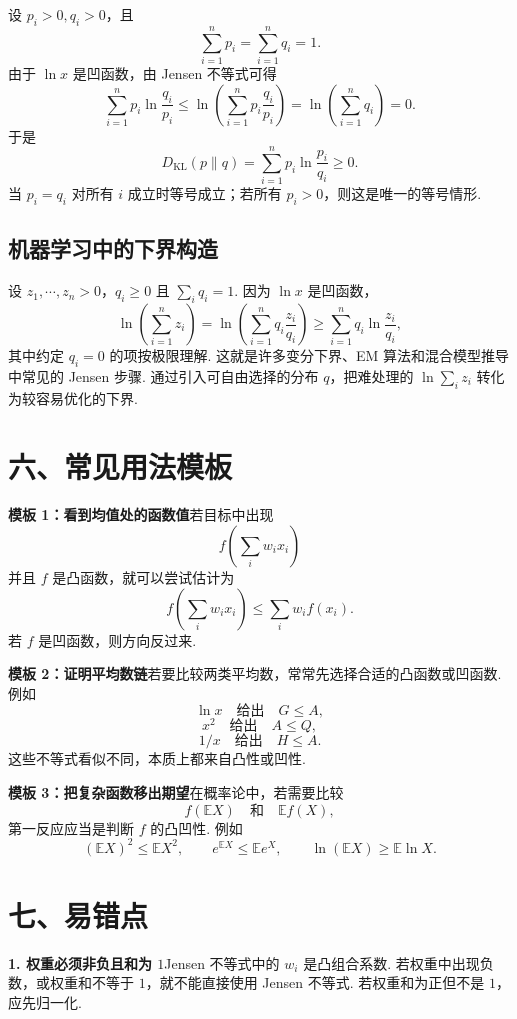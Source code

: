 \documentclass[UTF8,12pt,a4paper,fontset=fandol]{ctexart}
\begin{document}
设 $p_i>0,q_i>0$，且
\[
  \sum_{i=1}^n p_i=\sum_{i=1}^n q_i=1.
\]
由于 $\ln x$ 是凹函数，由 Jensen 不等式可得
\[
  \sum_{i=1}^n p_i\ln\frac{q_i}{p_i}
  \le
  \ln\left(\sum_{i=1}^n p_i\frac{q_i}{p_i}\right)
  =
  \ln\left(\sum_{i=1}^n q_i\right)
  =0.
\]
于是
\[
  D_{\mathrm{KL}}(p\|q)
  =
  \sum_{i=1}^n p_i\ln\frac{p_i}{q_i}
  \ge0.
\]
当 $p_i=q_i$ 对所有 $i$ 成立时等号成立；若所有 $p_i>0$，则这是唯一的等号情形.

\subsection*{机器学习中的下界构造}

设 $z_1,\cdots,z_n>0$，$q_i\ge0$ 且 $\sum_iq_i=1$. 因为 $\ln x$ 是凹函数，
\[
  \ln\left(\sum_{i=1}^n z_i\right)
  =
  \ln\left(\sum_{i=1}^n q_i\frac{z_i}{q_i}\right)
  \ge
  \sum_{i=1}^n q_i\ln\frac{z_i}{q_i},
\]
其中约定 $q_i=0$ 的项按极限理解. 这就是许多变分下界、EM 算法和混合模型推导中常见的 Jensen 步骤. 通过引入可自由选择的分布 $q$，把难处理的 $\ln\sum_i z_i$ 转化为较容易优化的下界.

\section*{六、常见用法模板}

\noindent\textbf{模板 1：看到均值处的函数值}\quad 若目标中出现
\[
  f\left(\sum_iw_ix_i\right)
\]
并且 $f$ 是凸函数，就可以尝试估计为
\[
  f\left(\sum_iw_ix_i\right)\le\sum_iw_if(x_i).
\]
若 $f$ 是凹函数，则方向反过来.

\noindent\textbf{模板 2：证明平均数链}\quad 若要比较两类平均数，常常先选择合适的凸函数或凹函数. 例如
\[
  \ln x\quad\text{给出}\quad G\le A,
\]
\[
  x^2\quad\text{给出}\quad A\le Q,
\]
\[
  1/x\quad\text{给出}\quad H\le A.
\]
这些不等式看似不同，本质上都来自凸性或凹性.

\noindent\textbf{模板 3：把复杂函数移出期望}\quad 在概率论中，若需要比较
\[
  f(\mathbb EX)\quad\text{和}\quad \mathbb E f(X),
\]
第一反应应当是判断 $f$ 的凸凹性. 例如
\[
  (\mathbb EX)^2\le\mathbb EX^2,\qquad
  e^{\mathbb EX}\le\mathbb Ee^X,\qquad
  \ln(\mathbb EX)\ge\mathbb E\ln X.
\]

\section*{七、易错点}

\noindent\textbf{1. 权重必须非负且和为 $1$}\quad Jensen 不等式中的 $w_i$ 是凸组合系数. 若权重中出现负数，或权重和不等于 $1$，就不能直接使用 Jensen 不等式. 若权重和为正但不是 $1$，应先归一化.
\end{document}
